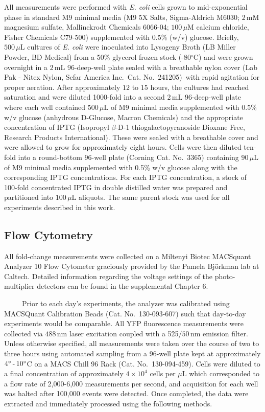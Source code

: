 \documentclass[12pt]{caltech_thesis}
\begin{document}
All measurements were performed with \emph{E. coli} cells grown to
mid-exponential phase in standard M9 minimal media (M9 5X Salts,
Sigma-Aldrich M6030; \(2\,\text{mM}\) magnesium sulfate, Mallinckrodt
Chemicals 6066-04; \(100\,\mu\text{M}\) calcium chloride, Fisher
Chemicals C79-500) supplemented with 0.5\% (w/v) glucose. Briefly,
\(500\,\mu\text{L}\) cultures of \emph{E. coli} were inoculated into
Lysogeny Broth (LB Miller Powder, BD Medical) from a 50\% glycerol
frozen stock (-80\(^\circ\)C) and were grown overnight in a
\(2\,\text{mL}\) 96-deep-well plate sealed with a breathable nylon cover
(Lab Pak - Nitex Nylon, Sefar America Inc.~Cat. No.~241205)~with rapid
agitation for proper aeration. After approximately \(12\) to \(15\)
hours, the cultures had reached saturation and were diluted 1000-fold
into a second \(2\,\text{mL}\) 96-deep-well plate where each well
contained \(500\,\mu\text{L}\) of M9 minimal media supplemented with
0.5\% w/v glucose (anhydrous D-Glucose, Macron Chemicals) and the
appropriate concentration of IPTG (Isopropyl \(\beta\)-D-1
thiogalactopyranoside Dioxane Free, Research Products International).
These were sealed with a breathable cover and were allowed to grow for
approximately eight hours. Cells were then diluted ten-fold into a
round-bottom 96-well plate (Corning Cat. No.~3365) containing
\(90\,\mu\text{L}\) of M9 minimal media supplemented with 0.5\% w/v
glucose along with the corresponding IPTG concentrations. For each IPTG
concentration, a stock of 100-fold concentrated IPTG in double distilled
water was prepared and partitioned into \(100\,\mu\text{L}\) aliquots.
The same parent stock was used for all experiments described in this
work.

\hypertarget{flow-cytometry}{%
\subsection{Flow Cytometry}\label{flow-cytometry}}

All fold-change measurements were collected on a Miltenyi Biotec
MACSquant Analyzer 10 Flow Cytometer graciously provided by the Pamela
Björkman lab at Caltech. Detailed information regarding the voltage
settings of the photo-multiplier detectors can be found in the
supplemental Chapter 6.

~~~~~Prior to each day's experiments, the analyzer was calibrated using
MACSQuant Calibration Beads (Cat. No.~130-093-607) such that day-to-day
experiments would be comparable. All YFP fluorescence measurements were
collected via \(488\,\text{nm}\) laser excitation coupled with a
525/\(50\,\text{nm}\) emission filter. Unless otherwise specified, all
measurements were taken over the course of two to three hours using
automated sampling from a 96-well plate kept at approximately
\(4^\circ \, \hbox{-} \, 10^\circ\)C on a MACS Chill 96 Rack (Cat.
No.~130-094-459). Cells were diluted to a final concentration of
approximately \(4\times 10^{4}\) cells per \(\mu\text{L}\) which
corresponded to a flow rate of 2,000-6,000 measurements per second, and
acquisition for each well was halted after 100,000 events were detected.
Once completed, the data were extracted and immediately processed using
the following methods.
\end{document}
